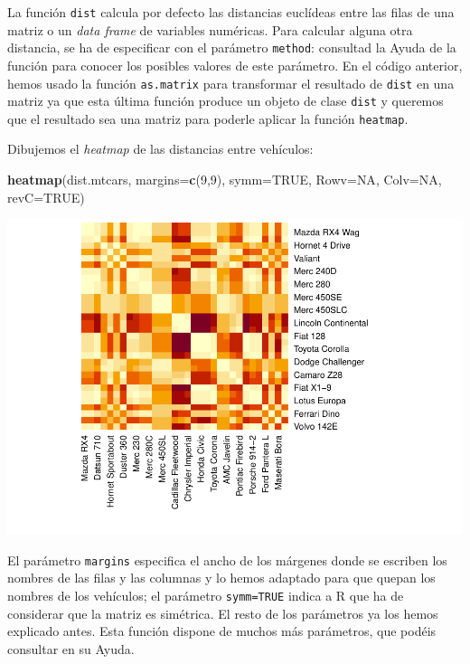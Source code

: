 \documentclass[
]{book}
\newenvironment{Shaded}{\begin{snugshade}}{\end{snugshade}}
\newcommand{\DataTypeTok}[1]{\textcolor[rgb]{0.13,0.29,0.53}{#1}}
\newcommand{\DecValTok}[1]{\textcolor[rgb]{0.00,0.00,0.81}{#1}}
\newcommand{\KeywordTok}[1]{\textcolor[rgb]{0.13,0.29,0.53}{\textbf{#1}}}
\newcommand{\NormalTok}[1]{#1}
\newcommand{\OtherTok}[1]{\textcolor[rgb]{0.56,0.35,0.01}{#1}}
\theoremstyle{definition}
\theoremstyle{definition}
\theoremstyle{definition}
\theoremstyle{remark}
\begin{document}
La función \texttt{dist} calcula por defecto las distancias euclídeas entre las filas de una matriz o un \emph{data frame} de variables numéricas. Para calcular alguna otra distancia, se ha de especificar con el parámetro \texttt{method}: consultad la Ayuda de la función para conocer los posibles valores de este parámetro. En el código anterior, hemos usado la función \texttt{as.matrix} para transformar el resultado de \texttt{dist} en una matriz ya que esta última función produce un objeto de clase \texttt{dist} y queremos que el resultado sea una matriz para poderle aplicar la función \texttt{heatmap}.

Dibujemos el \emph{heatmap} de las distancias entre vehículos:

\begin{Shaded}
\begin{Highlighting}[]
\KeywordTok{heatmap}\NormalTok{(dist.mtcars, }\DataTypeTok{margins=}\KeywordTok{c}\NormalTok{(}\DecValTok{9}\NormalTok{,}\DecValTok{9}\NormalTok{), }\DataTypeTok{symm=}\OtherTok{TRUE}\NormalTok{, }\DataTypeTok{Rowv=}\OtherTok{NA}\NormalTok{, }\DataTypeTok{Colv=}\OtherTok{NA}\NormalTok{, }\DataTypeTok{revC=}\OtherTok{TRUE}\NormalTok{)  }
\end{Highlighting}
\end{Shaded}

\begin{center}\includegraphics[width=0.9\linewidth]{14cap13_EDextra_files/figure-latex/unnamed-chunk-17-1} \end{center}

El parámetro \texttt{margins} especifica el ancho de los márgenes donde se escriben los nombres de las filas y las columnas y lo hemos adaptado para que quepan los nombres de los vehículos;
el parámetro \texttt{symm=TRUE} indica a R que ha de considerar que la matriz es simétrica. El resto de los parámetros ya los hemos explicado antes. Esta función dispone de muchos más parámetros, que podéis consultar en su Ayuda.
\end{document}
